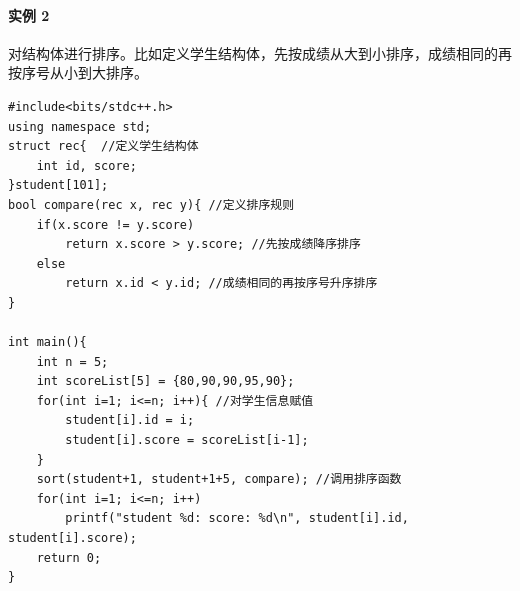 \documentclass[UTF8]{ctexart}
\begin{document}
\BgThispage
\paragraph{实例 2} 对结构体进行排序。比如定义学生结构体，先按成绩从大到小排序，成绩相同的再按序号从小到大排序。
\begin{lstlisting}
#include<bits/stdc++.h>
using namespace std;
struct rec{  //定义学生结构体
    int id, score;
}student[101];
bool compare(rec x, rec y){ //定义排序规则
    if(x.score != y.score)
        return x.score > y.score; //先按成绩降序排序
    else
        return x.id < y.id; //成绩相同的再按序号升序排序
}

int main(){
	int n = 5;
	int scoreList[5] = {80,90,90,95,90};
	for(int i=1; i<=n; i++){ //对学生信息赋值
		student[i].id = i;
		student[i].score = scoreList[i-1];
	}
	sort(student+1, student+1+5, compare); //调用排序函数
	for(int i=1; i<=n; i++)
		printf("student %d: score: %d\n", student[i].id, student[i].score);
	return 0;
}
\end{lstlisting}
\end{document}
